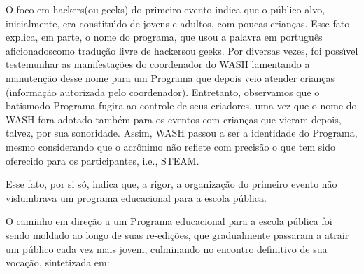 \documentclass[
12pt,		%
openright,	%
twoside,  %
a4paper,			%
chapter=TITLE,		%
english,			%
french,				%
spanish,			%
brazil				%
]{USPSC-classe/USPSC}
\begin{document}
O foco em \textquotedbl hackers\textquotedbl  (ou \textquotedbl geeks\textquotedbl ) do primeiro evento indica que o p\'ublico alvo, inicialmente, era constitu\'{\i}do de jovens e adultos, com  poucas crian\c{c}as. Esse fato explica, em parte, o nome do programa, que usou a palavra em portugu\^es \textquotedbl aficionados\textquotedbl  como tradu\c{c}\~ao livre de \textquotedbl hackers\textquotedbl  ou \textquotedbl geeks\textquotedbl . Por diversas vezes, foi poss\'{\i}vel testemunhar as manifesta\c{c}\~oes do coordenador do WASH lamentando a manuten\c{c}\~ao desse nome para um Programa que depois veio atender crian\c{c}as (informa\c{c}\~ao autorizada pelo coordenador). Entretanto, observamos que o \textquotedbl batismo\textquotedbl  do Programa fugira ao controle de seus criadores, uma vez que o nome do WASH fora adotado tamb\'em para os eventos com crian\c{c}as que vieram depois, talvez, por sua sonoridade. Assim, \textquotedbl  WASH \textquotedbl  passou a ser a identidade do Programa, mesmo considerando que o acr\^onimo n\~ao reflete com precis\~ao o que tem sido oferecido para os participantes, i.e., STEAM.









Esse fato, por si s\'o, indica que, a rigor, a organiza\c{c}\~ao do primeiro evento n\~ao vislumbrava um programa educacional para a escola p\'ublica.









O caminho em dire\c{c}\~ao a um Programa educacional para a escola p\'ublica foi sendo moldado ao longo de suas re-edi\c{c}\~oes, que gradualmente passaram a atrair um p\'ublico cada vez mais jovem, culminando no encontro definitivo de sua voca\c{c}\~ao, sintetizada em:










\noindent\begin{center}\mbox{\centering{}}\end{center}
\end{document}
